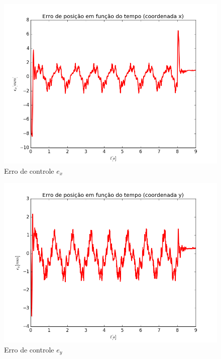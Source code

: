 \documentclass[]{politex}
\begin{document}
\begin{multicols}{2}
\begin{figure}[H]
	\centering
	\includegraphics[scale=0.39]{../../../Experimental/Aquisicoes/CTCt_circulo/ex.png}  
	\caption{Erro de controle $e_x$}
	\label{fig:CTCq_circulo_ex}
\end{figure}
\begin{figure}[H]
	\centering
	\includegraphics[scale=0.39]{../../../Experimental/Aquisicoes/CTCt_circulo/ey.png}  
	\caption{Erro de controle $e_y$}
	\label{fig:CTCq_circulo_ey}
\end{figure}
\end{multicols}
\end{document}
